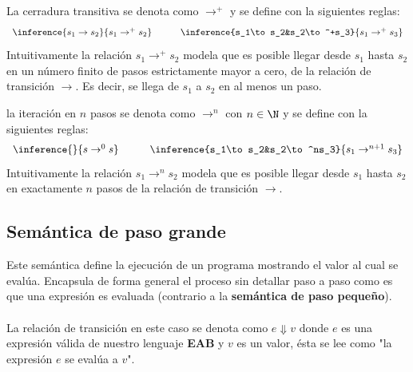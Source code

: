     \begin{definition} La cerradura transitiva se denota como $\to^+$ y se define con la siguientes reglas:
        \[
            \begin{array}{ccc}
                \inference{s_1\to s_2}{s_1\to^+s_2}&
                \quad&
                \inference{s_1\to s_2&s_2\to^+s_3}{s_1\to^+s_3}
            \end{array}
        \]
        Intuitivamente la relación $s_1\to^+s_2$ modela que es posible llegar desde $s_1$ hasta $s_2$ en un número finito de pasos estrictamente mayor a cero, de la relación de transición $\to$. Es decir, se llega de $s_1$ a $s_2$ en al menos un paso.
    \end{definition}
    
    \begin{definition} la iteración en $n$ pasos se denota como $\to^n$ con $n\in\N$ y se define con la siguientes reglas:
        \[
            \begin{array}{ccc}
                \inference{}{s\to^0s}&
                \quad&
                \inference{s_1\to s_2&s_2\to^ns_3}{s_1\to^{n+1}s_3}
            \end{array}
        \]
        Intuitivamente la relación $s_1\to^ns_2$ modela que es posible llegar desde $s_1$ hasta $s_2$ en exactamente $n$ pasos de la relación de transición $\to$.
    \end{definition}

    \subsection{Semántica de paso grande}
    Este semántica define la ejecución de un programa mostrando el valor al cual se evalúa. Encapsula de forma general el proceso sin detallar paso a paso como es que una expresión es evaluada (contrario a la \textbf{semántica de paso pequeño}).\\\\
    La relación de transición en este caso se denota como $e \Downarrow v$ donde $e$ es una expresión válida de nuestro lenguaje \textbf{EAB} y $v$ es un valor, ésta se lee como "la expresión $e$ se evalúa a $v$".

